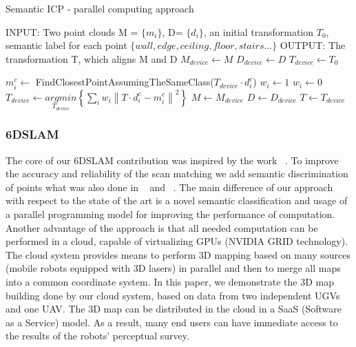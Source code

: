 \documentclass{article}
\begin{document}
\begin{algorithm}
\caption{Semantic ICP - parallel computing approach}
\begin{algorithmic}
\label{algorithm:gpgpuICPsemantic}
\STATE INPUT: Two point clouds M = $\{m_i\}$, D= $\{d_i\}$, an initial transformation $T_0$, semantic label for each point $\{wall, edge, ceiling, floor, stairs...\}$
\STATE OUTPUT: The transformation T, which aligns M and D
\STATE $M_{device} \leftarrow M $
\STATE $D_{device} \leftarrow D $
\STATE $T_{device} \leftarrow{T_0}$

        \STATE $m_{i}^{c}\leftarrow$ FindClosestPointAssumingTheSameClass($T_{device}\cdot d_{i}^{c}$)
        \STATE $w_{i}\leftarrow 1$
    \ELSE
	\STATE $w_{i}\leftarrow 0$
    \ENDIF
  \ENDFOR
  \STATE $T_{device} \leftarrow \underset{T_{device}}{argmin} \left \{ \sum_{i}^{} w_{i} \left \| T\cdot d_{i}^{c}-m_{i}^{c}  \right \| ^{2}  \right \}  $ 
\ENDFOR
\STATE $M \leftarrow M_{device} $
\STATE $D \leftarrow D_{device} $
\STATE $T \leftarrow T_{device} $
\end{algorithmic}
\end{algorithm}

\subsubsection{6DSLAM}
The core of our 6DSLAM contribution was inspired by the work ~\cite{Borrmann:2008:GCM:1342428.1342686}.
To improve the accuracy and reliability of the scan matching we add semantic discrimination of points what was also done in ~\cite{Nuchter053dmapping} and ~\cite{Pfaff:2007:EEE:1229565.1229570}.
The main difference of our approach with respect to the state of the art is a novel semantic classification and usage of a parallel programming model for improving the performance of computation.
Another advantage of the approach is that all needed computation can be performed in a cloud, capable of virtualizing GPUs (NVIDIA GRID technology).
The cloud system provides means to perform 3D mapping based on many sources (mobile robots equipped with 3D lasers) in parallel and then to merge all maps into a common coordinate system.
In this paper, we demonstrate the 3D map building done by our cloud system, based on data from two independent UGVs and one UAV.
The 3D map can be distributed in the cloud in a SaaS (Software as a Service) model.
As a result, many end users can have immediate access to the results of the robots' perceptual survey.
\end{document}
